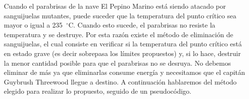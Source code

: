 \documentclass[10pt, a4paper]{article}
\begin{document}
Cuando el parabrisas de la nave El Pepino Marino est\'a siendo atacado por sanguijuelas mutantes, puede suceder que la temperatura del punto cr\'itico sea mayor o igual a 235\hspace{-1.5mm}$\phantom{a}^{\circ}$C. Cuando esto sucede, el parabrisas no resiste la temperatura y se destruye. Por esta raz\'on existe el m\'etodo de eliminaci\'on de sanguijuelas, el cual consiste en verificar si la temperatura del punto cr\'itico est\'a en estado grave (es decir sobrepasa los l\'imites propuestos) y, si lo hace, destruir la menor cantidad posible para que el parabrisas no se desruya. No debemos eliminar de m\'as ya que eliminarlas consume energ\'ia y necesitamos que el capit\'an Guybrush Threewood llegue a destino. A continuaci\'on hablaremos del m\'etodo elegido para realizar lo propuesto, seguido de un pseudoc\'odigo.
\end{document}

